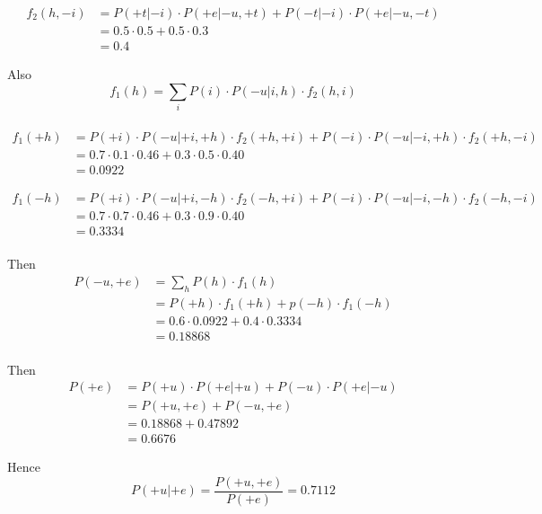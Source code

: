 \documentclass[]{article}
\begin{document}
\begin{equation} 
\begin{split}
f_2(h,-i) & = P(+t|-i)\cdot P(+e|-u,+t)+P(-t|-i)\cdot P(+e|-u,-t) \\
 & = 0.5\cdot 0.5+0.5\cdot 0.3 \\
 & = 0.4
\end{split}
\end{equation}

Also $$f_1(h) = \sum_{i}P(i) \cdot P(-u|i,h)\cdot f_2(h,i)$$ \\
\begin{equation} 
\begin{split}
f_1(+h) & = P(+i) \cdot P(-u|+i,+h)\cdot f_2(+h,+i)+P(-i) \cdot P(-u|-i,+h)\cdot f_2(+h,-i) \\
 & = 0.7\cdot 0.1\cdot 0.46+0.3\cdot 0.5\cdot 0.40 \\
 & = 0.0922
\end{split}
\end{equation}

\begin{equation} 
\begin{split}
f_1(-h) & = P(+i) \cdot P(-u|+i,-h)\cdot f_2(-h,+i)+P(-i) \cdot P(-u|-i,-h)\cdot f_2(-h,-i) \\
 & = 0.7\cdot 0.7\cdot 0.46+0.3\cdot 0.9\cdot 0.40 \\
 & = 0.3334
\end{split}
\end{equation}
\\
Then
\begin{equation} 
\begin{split}
P(-u,+e) & = \sum_{h}P(h)\cdot f_1(h) \\
 & = P(+h)\cdot f_1(+h) + p(-h)\cdot f_1(-h) \\
 & = 0.6\cdot 0.0922+0.4\cdot 0.3334 \\
 & = 0.18868
\end{split}
\end{equation}
\\
Then
\begin{equation} 
\begin{split}
P(+e) & = P(+u)\cdot P(+e|+u) + P(-u)\cdot P(+e|-u) \\
 & = P(+u,+e) + P(-u,+e) \\
 & = 0.18868 + 0.47892 \\
 & = 0.6676
\end{split}
\end{equation}

Hence $$P(+u|+e) = \frac {P(+u, +e)}{P(+e)} = 0.7112 $$
\end{document}
